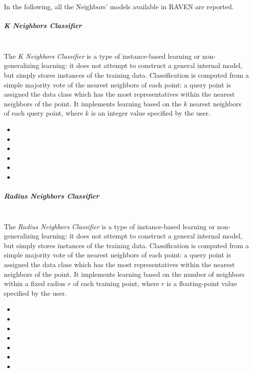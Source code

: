 
In the following, all the Neighbors' models available in RAVEN are reported.
%
\subparagraph{K Neighbors Classifier}
\mbox{}
\\The \textit{K Neighbors Classifier} is a type of instance-based learning or
non-generalizing learning: it does not attempt to construct a general internal
model, but simply stores instances of the training data.
%
Classification is computed from a simple majority vote of the nearest neighbors
of each point: a query point is assigned the data class which has the most
representatives within the nearest neighbors of the point.
%
It implements learning based on the $k$ nearest neighbors of each query point,
where $k$ is an integer value specified by the user.

\begin{itemize}
  \item {}
  \item {}
  \item {}
  \item {}
  \item {}
  \item {}
\end{itemize}
\subparagraph{Radius Neighbors Classifier}
\mbox{}
\\The \textit{Radius Neighbors Classifier} is a type of instance-based learning
or non-generalizing learning: it does not attempt to construct a general
internal model, but simply stores instances of the training data.
%
Classification is computed from a simple majority vote of the nearest neighbors
of each point: a query point is assigned the data class which has the most
representatives within the nearest neighbors of the point.
%
It implements learning based on the number of neighbors within a fixed radius
$r$ of each training point, where $r$ is a floating-point value specified by the
user.

\begin{itemize}
  \item {}
  \item {}
  \item {}
  \item {}
  \item {}
  \item {}
  \item {}
\end{itemize}

